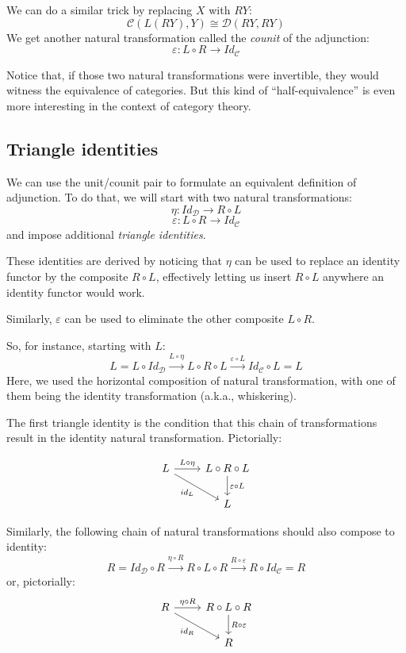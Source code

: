 \documentclass[DaoFP]{subfiles}
\begin{document}
We can do a similar trick by replacing $X$ with $R Y$:
\[  \mathcal{C} (L (R Y), Y) \cong \mathcal{D}( R Y , R Y)\]
We get another natural transformation called the \emph{counit} of the adjunction:
\[ \varepsilon \colon L \circ R \to Id_{\mathcal{C}}  \]

Notice that, if those two natural transformations were invertible, they would witness the equivalence of categories. But this kind of ``half-equivalence'' is even more interesting in the context of category theory. 

\subsection{Triangle identities}

We can use the unit/counit pair to formulate an equivalent  definition of adjunction. To do that, we will start with two natural transformations:
\[ \eta \colon Id_{\mathcal{D}} \to R \circ L \]
\[ \varepsilon \colon L \circ R \to Id_{\mathcal{C}}  \]
and impose additional \emph{triangle identities}. 

These identities are derived by noticing that $\eta$ can be used to replace an identity functor by the composite $R \circ L$, effectively letting us insert $R \circ L$ anywhere an identity functor would work.

Similarly, $\varepsilon$ can be used to eliminate the other composite $L \circ R$. 

So, for instance, starting with $L$:
\[ L = L \circ Id_{\mathcal{D}} \xrightarrow{L \circ \eta} L \circ R \circ L \xrightarrow{\varepsilon \circ L} Id_{\mathcal{C}} \circ L = L \]
Here, we used the horizontal composition of natural transformation, with one of them being the identity transformation (a.k.a., whiskering).

The first triangle identity is the condition that this chain of transformations result in the identity natural transformation. Pictorially:

\[
 \begin{tikzcd}
 L
 \arrow[r, "L \circ \eta"]
 \arrow[rd, "id_L"']
 & L \circ R \circ L
 \arrow[d, "\varepsilon \circ L"]
 \\
 & L
  \end{tikzcd}
\]

Similarly, the following chain of natural transformations should also compose to identity:
\[ R = Id_{\mathcal{D}} \circ R \xrightarrow{\eta \circ R} R \circ L \circ R \xrightarrow{R \circ \varepsilon} R \circ Id_{\mathcal{C}} = R \]
or, pictorially:
\[
 \begin{tikzcd}
 R
 \arrow[r, "\eta \circ R"]
 \arrow[rd, "id_R"']
 & R \circ L \circ R
 \arrow[d, "R \circ \varepsilon"]
 \\
 & R
  \end{tikzcd}
\]
\end{document}
